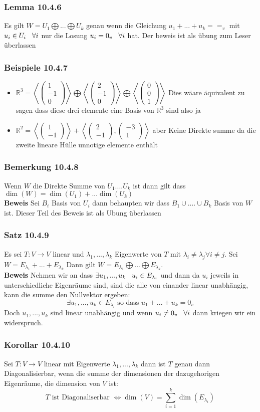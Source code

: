 \documentclass{article}
\newcommand{\smspc}{\hspace{0.3cm}}
\newcommand{\satz}[1]{\subsubsection*{Satz {#1}}}
\newcommand{\korollar}[1]{\subsubsection*{Korollar {#1}}}
\newcommand{\beweis}{\\\textbf{Beweis }}
\newcommand{\beispiel}[1]{\subsubsection*{Beispiele {#1}}}
\newcommand{\bemerkung}[1]{\subsubsection*{Bemerkung {#1}}}
\newcommand{\lemma}[1]{\subsubsection*{Lemma {#1}}}
\begin{document}
\lemma{10.4.6} Es gilt $W=U_1\bigoplus...\bigoplus U_k$ genau wenn die Gleichung $u_1+...+u_k==_v$ mit $u_i\in U_i \smspc \forall i$ nur die Losung $u_i=0_v\smspc\forall i$ hat. Der beweis ist als übung zum Leser überlassen
\beispiel{10.4.7}\begin{itemize}
\item{$\mathbb{R}^3=\left<\begin{pmatrix}1\\-1\\0\end{pmatrix}\right>\bigoplus\left<\begin{pmatrix}2\\-1\\0\end{pmatrix}\right>\bigoplus\left<\begin{pmatrix}0\\0\\1\end{pmatrix}\right>$ Dies wäare äquivalent zu sagen dass diese drei elemente eine Basis von $\mathbb{R}^3$ sind also ja}
\item{$\mathbb{R}^2=\left<\begin{pmatrix}1\\-1\end{pmatrix}\right>+\left<\begin{pmatrix}2\\-1\end{pmatrix},\begin{pmatrix}-3\\1\end{pmatrix}\right>$ aber Keine Direkte summe da die zweite lineare Hülle unnotige elemente enthält}
  
\end{itemize}
\bemerkung{10.4.8} Wenn $W$ die Direkte Summe von $U_1....U_k$ ist dann gilt dass $\dim(W)=\dim(U_1)+...\dim(U_k)$
\beweis Sei $B_i$ Basis von $U_i$ dann behaupten wir dass $B_1\cup....\cup B_k$ Basis von $W$ ist. Dieser Teil des Beweis ist als Ubung überlassen 
\satz{10.4.9} Es sei $T:V\rightarrow V$ linear und $\lambda_1,...,\lambda_k$ Eigenwerte von $T$ mit $\lambda_i\neq\lambda_j\forall i\neq j$. Sei $W =E_{\lambda_1}+...+E_{\lambda_k}$ Dann gilt $W=E_{\lambda_1}\bigoplus...\bigoplus E_{\lambda_k}$.
\beweis Nehmen wir an dass $\exists u_1,...,u_k\smspc u_i\in E_{\lambda_i}$ und dann da $u_i$ jeweils in unterschiedliche Eigenräume sind, sind die alle von einander linear unabhängig, kann die summe den Nullvektor ergeben:\[\exists u_1,...,u_k\in E_{\lambda_i}\text{ so dass } u_1+...+u_k=0_v\]
Doch $u_1,...,u_k$ sind linear unabhängig und wenn $u_i\neq 0_v\smspc \forall i$ dann kriegen wir ein widerspruch.
 \korollar{10.4.10} Sei $T:V\rightarrow V$ linear mit Eigenwerte $\lambda_1,...,\lambda_k$ dann ist $T$ genau dann Diagonalisierbar, wenn die summe der dimensionen der dazugehorigen Eigenräume, die dimension von $V$ ist: \[T \text{ ist Diagonaliserbar }\Leftrightarrow\dim(V)=\sum_{i=1}^k\dim(E_{\lambda_i})\] 
\end{document}
